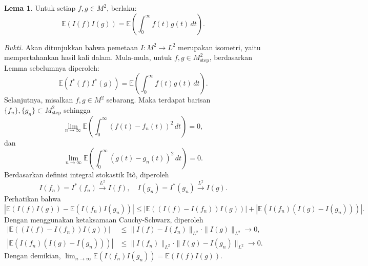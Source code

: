 \documentclass[aspectratio=169,11pt]{beamer}
\theoremstyle{definition}
\newtheorem{lema}{Lema}
\begin{document}
\begin{frame}[allowframebreaks]{\insertsection}{\insertsubsection}
  \begin{lema}
    Untuk setiap $f, g \in M^2$, berlaku:
    \begin{equation*}
      \mathbb{E}(I(f)I(g)) = \mathbb{E}\left(\int_0^\infty f(t)g(t) \, dt\right).
    \end{equation*}
  \end{lema}
  \textit{Bukti.} Akan ditunjukkan bahwa pemetaan $I: M^2 \to L^2$ merupakan isometri, yaitu mempertahankan hasil kali dalam. Mula-mula, untuk $f, g \in M_{\text{step}}^2$, berdasarkan Lemma sebelumnya diperoleh:
  \begin{equation*}
    \mathbb{E}(I^*(f)I^*(g)) = \mathbb{E}\left(\int_0^\infty f(t)g(t) \, dt\right).
  \end{equation*}
  Selanjutnya, misalkan $f, g \in M^2$ sebarang. Maka terdapat barisan $\{f_n\}, \{g_n\} \subset M_{\text{step}}^2$ sehingga
  \begin{equation*}
    \lim_{n \to \infty} \mathbb{E}\left(\int_0^\infty (f(t) - f_n(t))^2 \, dt\right) = 0,
  \end{equation*}
  dan
  \begin{equation*}
    \lim_{n \to \infty} \mathbb{E}\left(\int_0^\infty (g(t) - g_n(t))^2 \, dt\right) = 0.
  \end{equation*}
  Berdasarkan definisi integral stokastik Itô, diperoleh
  \begin{equation*}
    I(f_n) = I^*(f_n) \xrightarrow{L^2} I(f), \quad I(g_n) = I^*(g_n) \xrightarrow{L^2} I(g).
  \end{equation*}
  Perhatikan bahwa
  \begin{equation*}
    |\mathbb{E}(I(f)I(g)) - \mathbb{E}(I(f_n)I(g_n))| \leq |\mathbb{E}((I(f) - I(f_n))I(g))| + |\mathbb{E}(I(f_n)(I(g) - I(g_n)))|.
  \end{equation*}
  Dengan menggunakan ketaksamaan Cauchy-Schwarz, diperoleh
  \begin{align*}
    |\mathbb{E}((I(f) - I(f_n))I(g))|   & \leq \|I(f) - I(f_n)\|_{L^2} \cdot \|I(g)\|_{L^2} \to 0,   \\
    |\mathbb{E}(I(f_n)(I(g) - I(g_n)))| & \leq \|I(f_n)\|_{L^2} \cdot \|I(g) - I(g_n)\|_{L^2} \to 0.
  \end{align*}
  Dengan demikian, $\lim_{n \to \infty} \mathbb{E}(I(f_n)I(g_n)) = \mathbb{E}(I(f)I(g))$.


\end{frame}
\end{document}
